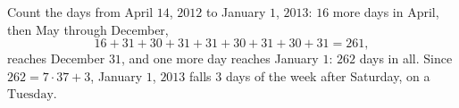 Count the days from April $14$, $2012$ to January $1$, $2013$: $16$ more days in April, then May through December,
\[
16+31+30+31+31+30+31+30+31=261 ,
\]
reaches December $31$, and one more day reaches January $1$: $262$ days in all. Since $262=7\cdot37+3$, January $1$, $2013$ falls $3$ days of the week after Saturday, on a $\boxed{\text{Tuesday}}$.
